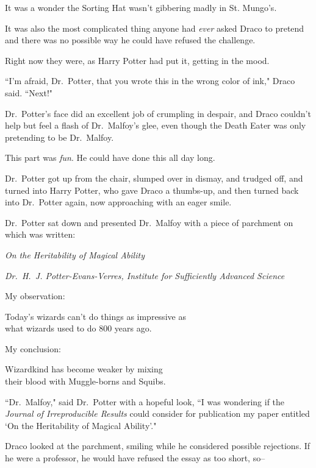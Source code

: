 It was a wonder the Sorting Hat wasn't gibbering madly in St. Mungo's.

It was also the most complicated thing anyone had \emph{ever} asked Draco to pretend and there was no possible way he could have refused the challenge.

Right now they were, as Harry Potter had put it, getting in the mood.

``I'm afraid, Dr.~Potter, that you wrote this in the wrong color of ink," Draco said. ``Next!"

Dr.~Potter's face did an excellent job of crumpling in despair, and Draco couldn't help but feel a flash of Dr.~Malfoy's glee, even though the Death Eater was only pretending to be Dr.~Malfoy.

This part was \emph{fun}. He could have done this all day long.

Dr.~Potter got up from the chair, slumped over in dismay, and trudged off, and turned into Harry Potter, who gave Draco a thumbs-up, and then turned back into Dr.~Potter again, now approaching with an eager smile.

Dr.~Potter sat down and presented Dr.~Malfoy with a piece of parchment on which was written:

\begin{center}
\emph{On the Heritability of Magical Ability}

\emph{Dr.~H.~J. Potter-Evans-Verres, Institute for Sufficiently Advanced Science}
\end{center}

\begin{writtenNote}
My observation:

Today's wizards can't do things as impressive as\\
what wizards used to do 800 years ago.

My conclusion:

Wizardkind has become weaker by mixing\\
their blood with Muggle-borns and Squibs.
\end{writtenNote}

``Dr.~Malfoy," said Dr.~Potter with a hopeful look, ``I was wondering if the \emph{Journal of Irreproducible Results} could consider for publication my paper entitled `On the Heritability of Magical Ability'."

Draco looked at the parchment, smiling while he considered possible rejections. If he were a professor, he would have refused the essay as too short, so\---

